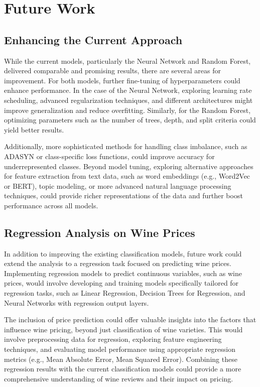 \section{Future Work}

\subsection{Enhancing the Current Approach}
While the current models, particularly the 
Neural Network and Random Forest, delivered comparable 
and promising results, there are several areas for 
improvement. For both models, further fine-tuning of 
hyperparameters could enhance performance. 
In the case of the Neural Network, exploring learning 
rate scheduling, advanced regularization techniques, 
and different architectures might improve generalization 
and reduce overfitting. Similarly, for the Random Forest, 
optimizing parameters such as the number of trees, depth, 
and split criteria could yield better results.

Additionally, more sophisticated methods for handling 
class imbalance, such as ADASYN or class-specific loss 
functions, could improve accuracy for underrepresented 
classes. Beyond model tuning, exploring alternative 
approaches for feature extraction from text data, 
such as word embeddings (e.g., Word2Vec or BERT), 
topic modeling, or more advanced natural language 
processing techniques, could provide richer 
representations of the data and further boost 
performance across all models.

\subsection{Regression Analysis on Wine Prices}
In addition to improving the existing classification 
models, future work could extend the analysis to a 
regression task focused on predicting wine prices. 
Implementing regression models to predict continuous 
variables, such as wine prices, would involve 
developing and training models specifically tailored 
for regression tasks, such as Linear Regression, 
Decision Trees for Regression, and Neural Networks
with regression output layers.

The inclusion of price prediction could offer valuable 
insights into the factors that influence wine pricing, 
beyond just classification of wine varieties. 
This would involve preprocessing data for regression, 
exploring feature engineering techniques, and 
evaluating model performance using appropriate 
regression metrics (e.g., Mean Absolute Error, Mean Squared Error). 
Combining these regression results with the 
current classification models could provide a 
more comprehensive understanding of wine reviews 
and their impact on pricing.


